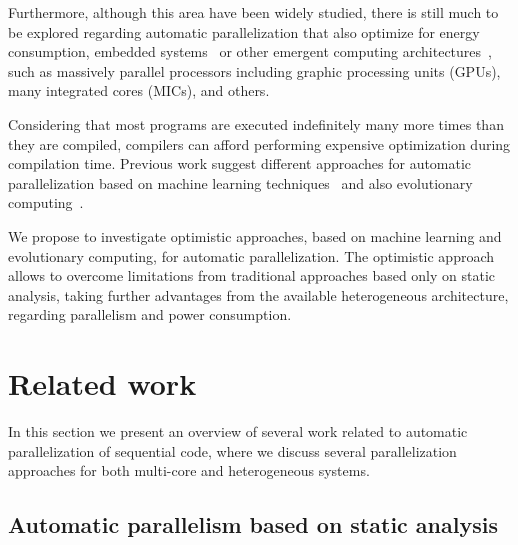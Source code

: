 \documentclass[a4paper,12pt]{article}
\newcommand\FIXME[1]{\textcolor{red}{FIX:}\textcolor{red}{#1}}
\begin{document}
Furthermore, although this area have been widely studied, there is still much
to be explored regarding automatic parallelization that also optimize for
energy consumption, embedded systems~\cite{cordes10} or other emergent
computing architectures~\cite{baskaran10}, such as massively parallel
processors including graphic processing units (GPUs), many integrated cores
(MICs), and others.

Considering that most programs are executed indefinitely many more times than
they are compiled, compilers can afford performing expensive optimization
during compilation time.  Previous work suggest different approaches for
automatic parallelization based on machine learning
techniques~\cite{tournavitis09,wang14a} and also evolutionary
computing~\cite{walsh95,walsh96,williams96,williams99}.

We propose to investigate optimistic approaches, based on machine learning and
evolutionary computing, for automatic parallelization.  The optimistic approach
allows to overcome limitations from traditional approaches based only on static
analysis, taking further advantages from the available heterogeneous
architecture, regarding parallelism and power consumption.

%

\section{Related work}

In this section we present an overview of several work related to automatic
parallelization of sequential code, where we discuss several parallelization
approaches for both multi-core and heterogeneous systems.

\subsection{Automatic parallelism based on static analysis}
\end{document}
